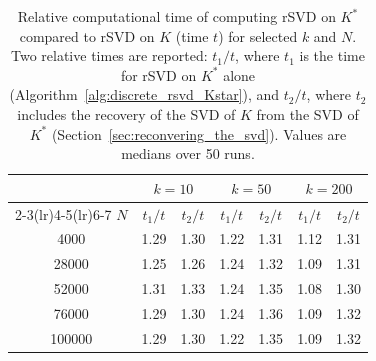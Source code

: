 \begin{table}[!htbp]
\centering
\begin{tabular}{c cc cc cc}
\toprule
    & \multicolumn{2}{c}{$k = 10$}
    & \multicolumn{2}{c}{$k = 50$}
    & \multicolumn{2}{c}{$k = 200$} \\
\cmidrule(lr){2-3}\cmidrule(lr){4-5}\cmidrule(lr){6-7}
    $N$ & $t_1 / t$ & $t_2 / t$ & $t_1 / t$ & $t_2 / t$ & $t_1 / t$ & $t_2 / t$ \\
\midrule
    4000   & 1.29 & 1.30 & 1.22 & 1.31 & 1.12 & 1.31 \\
    28000  & 1.25 & 1.26 & 1.24 & 1.32 & 1.09 & 1.31 \\
    52000  & 1.31 & 1.33 & 1.24 & 1.35 & 1.08 & 1.30 \\
    76000  & 1.29 & 1.30 & 1.24 & 1.36 & 1.09 & 1.32 \\
    100000 & 1.29 & 1.30 & 1.22 & 1.35 & 1.09 & 1.32 \\
\bottomrule
\end{tabular}
\caption{Relative computational time of computing rSVD on $K^*$ compared to rSVD on $K$ (time $t$) for selected $k$ and $N$. Two relative times are reported: $t_1 / t$, where $t_1$ is the time for rSVD on $K^*$ alone (Algorithm~\ref{alg:discrete_rsvd_Kstar}), and $t_2 / t$, where $t_2$ includes the recovery of the SVD of $K$ from the SVD of $K^*$ (Section~\ref{sec:reconvering_the_svd}). Values are medians over 50 runs.}
\label{tab:computational_time_adjoint}
\end{table}



